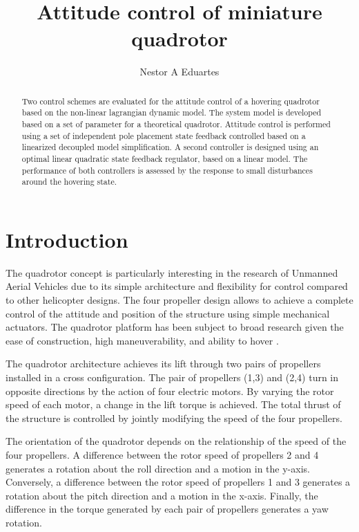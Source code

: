 \documentclass[12pt]{article}
\title{Attitude control of miniature quadrotor}
\author{Nestor A Eduartes}
\begin{document}
 
\maketitle
 
\begin{abstract}
Two control schemes are evaluated for the attitude control of a hovering quadrotor based on the non-linear lagrangian dynamic model. The system model is developed based on a set of parameter for a theoretical quadrotor. Attitude control is performed using a set of independent pole placement state feedback controlled based on a linearized decoupled model simplification. A second controller is designed using an optimal linear quadratic state feedback regulator, based on a linear model. The performance of both controllers is assessed by the response to small disturbances around the hovering state.
\end{abstract}

\section{Introduction}
The quadrotor concept is particularly interesting in the research of Unmanned Aerial Vehicles due to its simple architecture and flexibility for control compared to other helicopter designs. The four propeller design allows to achieve a complete control of the attitude and position of the structure using simple mechanical actuators. The quadrotor platform has been subject to broad research given the ease of construction, high  maneuverability, and ability to hover \cite{Cabe14}.

The quadrotor architecture achieves its lift through two pairs of propellers installed in a cross configuration. The pair of propellers (1,3) and (2,4) turn in opposite directions by the action of four electric motors. By varying the rotor speed of each motor, a change in the lift torque is achieved. The total thrust of the structure is controlled by jointly modifying the speed of the four propellers. 

The orientation of the quadrotor depends on the relationship of the speed of the four propellers. A difference between the rotor speed of propellers 2 and 4 generates a rotation about the roll direction and a motion in the y-axis. Conversely, a difference between the rotor speed of propellers 1 and 3 generates a rotation about the pitch direction and a motion in the x-axis. Finally, the difference in the torque generated by each pair of propellers generates a yaw rotation.
\end{document}
